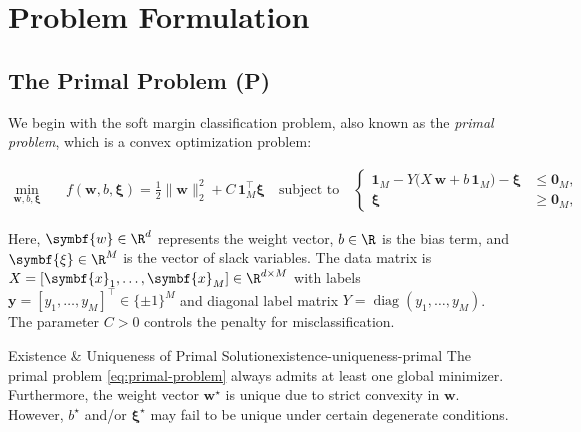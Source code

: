 \section{Problem Formulation}\label{chap:problem}
\subsection{The Primal Problem (P)}

We begin with the soft margin classification problem, also known as the \emph{primal problem}, which is a convex optimization problem:

\begin{align*}\label{eq:primal-problem}
	\min_{\symbf{w}, b, \symbf{\xi}} \quad 
	& f(\symbf{w}, b, \symbf{\xi}) 
	= \frac{1}{2}\|\symbf{w}\|_2^2 + C\,\symbf{1}_M^\top \symbf{\xi}
	\quad 
	\text{subject to} 
	\quad
	\begin{cases}
		\symbf{1}_M - Y\bigl(X\,\symbf{w} + b\,\symbf{1}_M\bigr) - \symbf{\xi} & \le \symbf{0}_M, \\[6pt]
		\symbf{\xi} \;\;&\ge \symbf{0}_M,
	\end{cases}\tag{P}
\end{align*}

Here, $\symbf{w} \in \R^d$ represents the weight vector, $b \in \R$ is the bias term, and $\symbf{\xi} \in \R^M$ is the vector of slack variables. 
The data matrix is $X = [\symbf{x}_1, \ldots, \symbf{x}_M] \in \R^{d \times M}$ with labels $\symbf{y}=[y_1, \ldots, y_M]^\top \in \{\pm1\}^M$ and diagonal label matrix $Y = \operatorname{diag}(y_1,\ldots,y_M)$. 
The parameter $C>0$ controls the penalty for misclassification.

\begin{theorem}{Existence \& Uniqueness of Primal Solution}{existence-uniqueness-primal}
  The primal problem \eqref{eq:primal-problem} always admits at least one global minimizer. Furthermore, the weight vector $\symbf{w}^\star$ is unique due to strict convexity in $\symbf{w}$. However, $b^\star$ and/or $\symbf{\xi}^\star$ may fail to be unique under certain degenerate conditions.
\end{theorem}

